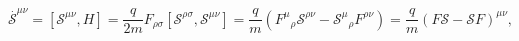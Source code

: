 \begin{equation}
\stackrel{.}{\mathcal{S}}^{\mu \nu }=\left[ \mathcal{S}^{\mu \nu },H\right] =%
\frac{q}{2m}F_{\rho \sigma }\left[ \mathcal{S}^{\rho \sigma },\mathcal{S}%
^{\mu \nu }\right] =\frac{q}{m}\left( F^{\mu }{}_{\rho }\mathcal{S}^{\rho
\nu }-\mathcal{S}^{\mu }{}_{\rho }F^{\rho \nu }\right) =\frac{q}{m}\left( F%
\mathcal{S}-\mathcal{S}F\right) ^{\mu \nu },
\end{equation}

